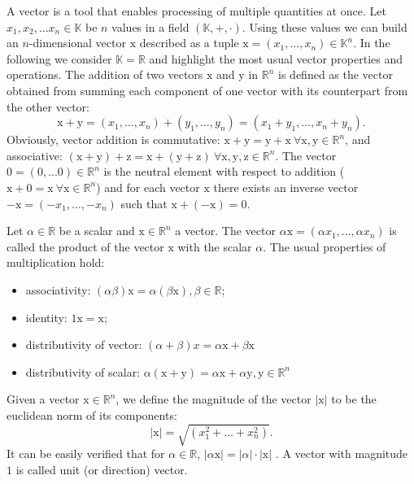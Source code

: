 \par A vector is a tool that enables processing of multiple quantities at once. \cite{IntroVec} Let $x_1, x_2, \ldots x_n \in \mathbb{K}$ be $n$ values in a field $(\mathbb{K},+,\cdot)$. Using these values we can build an $n$-dimensional vector $\mathrm{x}$ described as a tuple $\mathrm{x} = (x_1, \ldots,x_n)\in\mathbb{K}^n$. In the following we consider $\mathbb{K} = \mathbb{R}$ and highlight the most usual vector properties and operations.
The addition of two vectors $\mathrm{x}$ and $\mathrm{y}$ in $\mathbb{R}^n$ is defined as the vector obtained from summing each component of one vector with its counterpart from the other vector:
$$\mathrm{x}+\mathrm{y} = (x_1,\ldots,x_n)+(y_1,\ldots,y_n)=(x_1+y_1,\ldots,x_n+y_n).$$
Obviously, vector addition is commutative: $\mathrm{x}+\mathrm{y}=\mathrm{y}+\mathrm{x} \ \forall \mathrm{x},\mathrm{y}\in\mathbb{R}^n $, and associative: $(\mathrm{x}+\mathrm{y})+\mathrm{z}=\mathrm{x}+(\mathrm{y}+\mathrm{z}) \ \forall \mathrm{x},\mathrm{y},\mathrm{z}\in\mathbb{R}^n $. The vector $\mathrm{0}=(0,...0)\in \mathbb{R}^n$ is the neutral element with respect to addition ($\mathrm{x}+\mathrm{0}=\mathrm{x}\ \forall \mathrm{x} \in\mathbb{R}^n $) and for each vector $\mathrm{x}$ there exists an inverse vector $-\mathrm{x}=(-x_1,\ldots,-x_n)$ such that $\mathrm{x}+(-\mathrm{x})=\mathrm{0}$. \cite{IntroVec}

Let $\alpha\in\mathbb{R}$ be a scalar and $\mathrm{x}\in\mathbb{R}^n$ a vector. The vector $\alpha\mathrm{x}=(\alpha x_1,\ldots,\alpha x_n)$ is called the 
product of the vector $\mathrm{x}$ with the scalar $\alpha$. The usual properties of multiplication hold: \cite{IntroVec}
\begin{itemize}
\item associativity: $(\alpha\beta)\mathrm{x} = \alpha(\beta\mathrm{x}), \beta\in \mathbb{R}$;
\item identity: $\mathrm{1}\mathrm{x}=\mathrm{x}$;
\item distributivity of vector: $(\alpha+\beta)\mathrm{}{x}=\alpha\mathrm{x}+\beta\mathrm{x}$
\item distributivity of scalar:
$\alpha(\mathrm{x}+\mathrm{y})=\alpha\mathrm{x}+\alpha\mathrm{y}, \mathrm{y}\in\mathbb{R}^n$
\end{itemize} 

\par Given a vector $\mathrm{x}\in\mathbb{R}^n$, we define the magnitude of the vector $|\mathrm{x}|$ to be the euclidean norm of its components:
$$ |\mathrm{x}| = \sqrt{(x_1^2 + \ldots + x_n^2)}. $$
It can be easily verified that for $\alpha\in\mathbb{R}$, $|\alpha \mathrm{x}|=|\alpha|\cdot|\mathrm{x}|$ \cite{IntroVec}. A vector with magnitude $1$ is called unit (or direction) vector. 

